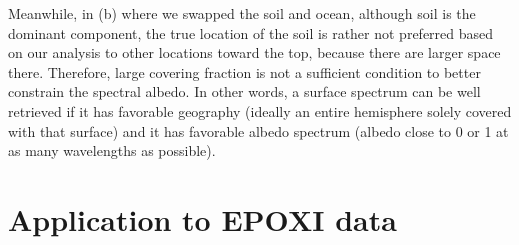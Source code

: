\documentclass[iop,numberedappendix,apj,]{emulateapj}
\begin{document}
Meanwhile, in (b) where we swapped the soil and ocean, although soil is the dominant component, the true location of the soil is rather not preferred based on our analysis to other locations toward the top, because there are larger space there. 
Therefore, large covering fraction is not a sufficient condition to better constrain the spectral albedo. 
In other words, a surface spectrum can be well retrieved if it has favorable geography (ideally an entire hemisphere solely covered with that surface) and it has favorable albedo spectrum (albedo close to 0 or 1 at as many wavelengths as possible). 



\section{Application to EPOXI data}
\label{s:EPOXI}
\end{document}
